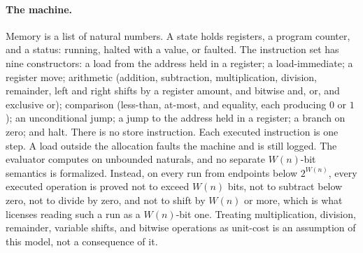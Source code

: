 \documentclass[11pt]{article}
\theoremstyle{definition}
\theoremstyle{remark}
\begin{document}
\paragraph{The machine.}
Memory is a list of natural numbers. A state holds registers, a program
counter, and a status: running, halted with a value, or faulted. The
instruction set has nine constructors: a load from the address held in a
register; a load-immediate; a register move; arithmetic (addition,
subtraction, multiplication, division, remainder, left and right shifts by a
register amount, and bitwise and, or, and exclusive or); comparison
(less-than, at-most, and equality, each producing $0$ or $1$); an
unconditional jump; a jump to the address held in a register; a branch on
zero; and halt. There is no store instruction. Each executed instruction is
one step. A load outside the allocation faults the machine and is still
logged. The evaluator computes on unbounded naturals, and no separate
$W(n)$-bit semantics is formalized. Instead, on every run from endpoints
below $2^{W(n)}$, every executed operation is proved not to exceed $W(n)$
bits, not to subtract below zero, not to divide by zero, and not to shift by
$W(n)$ or more, which is what licenses reading such a run as a $W(n)$-bit
one. Treating multiplication, division, remainder, variable shifts, and
bitwise operations as unit-cost is an assumption of this model, not a
consequence of it.
\end{document}
